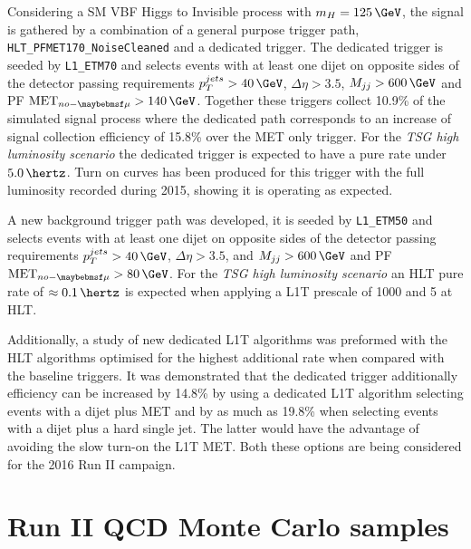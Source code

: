 Considering a \gls{SM} \gls{VBF} Higgs to Invisible process with $m_H=125\,\GeV$, the signal is gathered by a combination of a general purpose trigger path, \verb|HLT_PFMET170_NoiseCleaned| and a dedicated trigger. The dedicated trigger is seeded by \verb|L1_ETM70| and selects events with at least one dijet on opposite sides of the detector passing requirements $p_T^{jets}>40\,\GeV$, $\Delta\eta>3.5$, $M_{jj}>600\,\GeV$ and \gls{PF} $\text{MET}_{no-\mu}>140\,\GeV$. Together these triggers collect 10.9\% of the simulated signal process where the dedicated path corresponds to an increase of signal collection efficiency of 15.8\% over the \gls{MET} only trigger. For the \textit{\gls{TSG} high luminosity scenario} the dedicated trigger is expected to have a pure rate under $5.0\,\hertz$. Turn on curves has been produced for this trigger with the full luminosity recorded during 2015, showing it is operating as expected.

A new background trigger path was developed, it is seeded by \verb|L1_ETM50| and selects events with at least one dijet on opposite sides of the detector passing requirements $p_T^{jets}>40\,\GeV$, $\Delta\eta>3.5$, and $M_{jj}>600\,\GeV$ and \gls{PF} $\text{MET}_{no-\mu}>80\,\GeV$. For the \textit{\gls{TSG} high luminosity scenario} an \gls{HLT} pure rate of $\approx 0.1\,\hertz$ is expected when applying a \gls{L1T} prescale of 1000 and 5 at \gls{HLT}.

Additionally, a study of new dedicated \gls{L1T} algorithms was preformed with the \gls{HLT} algorithms optimised for the highest additional rate when compared with the baseline triggers. It was demonstrated that the dedicated trigger additionally efficiency can be increased by 14.8\% by using a dedicated \gls{L1T} algorithm selecting events with a dijet plus \gls{MET} and by as much as 19.8\% when selecting events with a dijet plus a hard single jet. The latter would have the advantage of avoiding the slow turn-on the \gls{L1T} \gls{MET}. Both these options are being considered for the 2016 Run II campaign.

\section{Run II QCD Monte Carlo samples}
\label{SECTION:RunIIPreparation_RunIIQCDMonteCarloSamples}


